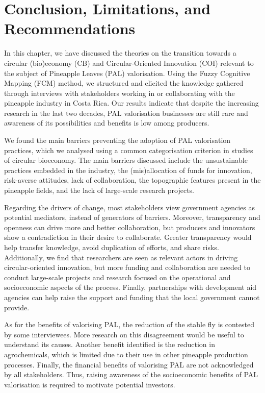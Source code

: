 \section{Conclusion, Limitations, and Recommendations}

In this chapter, we have discussed the theories on the transition towards a circular (bio)economy (CB) and Circular-Oriented Innovation (COI) relevant to the subject of Pineapple Leaves (PAL) valorisation. Using the Fuzzy Cognitive Mapping (FCM) method, we structured and elicited the knowledge gathered through interviews with stakeholders working in or collaborating with the pineapple industry in Costa Rica. Our results indicate that despite the increasing research in the last two decades, PAL valorisation businesses are still rare and awareness of its possibilities and benefits is low among producers. 

We found the main barriers preventing the adoption of PAL valorisation practices, which we analysed using a common categorisation criterion in studies of circular bioeconomy. The main barriers discussed include the unsustainable practices embedded in the industry, the (mis)allocation of funds for innovation, risk-averse attitudes, lack of collaboration, the topographic features present in the pineapple fields, and the lack of large-scale research projects. 

Regarding the drivers of change, most stakeholders view government agencies as potential mediators, instead of generators of barriers. Moreover, transparency and openness can drive more and better collaboration, but producers and innovators show a contradiction in their desire to collaborate. Greater transparency would help transfer knowledge, avoid duplication of efforts, and share risks. Additionally, we find that researchers are seen as relevant actors in driving circular-oriented innovation, but more funding and collaboration are needed to conduct large-scale projects and research focused on the operational and socioeconomic aspects of the process. Finally, partnerships with development aid agencies can help raise the support and funding that the local government cannot provide. 

As for the benefits of valorising PAL, the reduction of the stable fly is contested by some interviewees. More research on this disagreement would be useful to understand its causes. Another benefit identified is the reduction in agrochemicals, which is limited due to their use in other pineapple production processes. Finally, the financial benefits of valorising PAL are not acknowledged by all stakeholders. Thus, raising awareness of the socioeconomic benefits of PAL valorisation is required to motivate potential investors.

